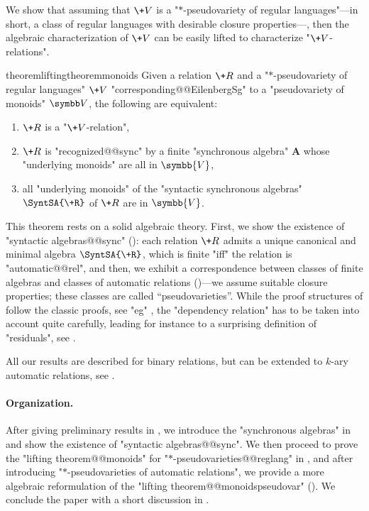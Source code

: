 We show that assuming that $\+V$ is a "$*$-pseudovariety of regular languages"---in short, a class of regular languages with desirable closure properties---, then the algebraic characterization of $\+V$ can be easily lifted to characterize "$\+V$-relations".

\begin{restatable*}{theorem}{liftingtheoremmonoids}
	\AP\label{thm:lifting-theorem-monoids}
	Given a relation $\+R$ and a "$\ast$-pseudovariety of regular languages" $\+V$
	"corresponding@@EilenbergSg" to a "pseudovariety of monoids" $\B{V}$,
	the following are equivalent:
	\begin{enumerate}
		\item $\+R$ is a "$\+V$-relation",
		\item $\+R$ is "recognized@@sync" by a finite "synchronous algebra" $\mathbf{A}$
			whose "underlying monoids" are all in $\symbb{V}$,
		\item all "underlying monoids" of the "syntactic synchronous algebras" $\SyntSA{\+R}$ of
			$\+R$ are in $\symbb{V}$.
	\end{enumerate} 
\end{restatable*}

This theorem rests on a solid algebraic theory. 
First, we show the existence of "syntactic algebras@@sync" (): 
each relation $\+R$ admits a unique canonical and minimal algebra $\SyntSA{\+R}$, which is finite 
"iff" the relation is "automatic@@rel",
and then, we exhibit a correspondence between classes of finite algebras and classes of
automatic relations ()---we assume suitable closure properties; these classes are called ``pseudovarieties''.
While the proof structures of  follow the classic proofs, see "eg" \cite{Pin2022MathematicalFoundations},
the "dependency relation" has to be taken into account quite carefully, leading for instance
to a surprising definition of "residuals", see .

\begin{remark}
	All our results are described for binary relations, but can be extended to
	$k$-ary automatic relations, see .
\end{remark}

\paragraph*{Organization.} After giving preliminary results in , we introduce
the "synchronous algebras" in  and show the existence of
"syntactic algebras@@sync". We then proceed to prove the "lifting theorem@@monoids" for 
"$*$-pseudovarieties@@reglang" in , and after introducing "$*$-pseudovarieties of automatic relations", we provide a more algebraic reformulation of the "lifting 
theorem@@monoidspseudovar" ().
We conclude the paper with
a short discussion in .


